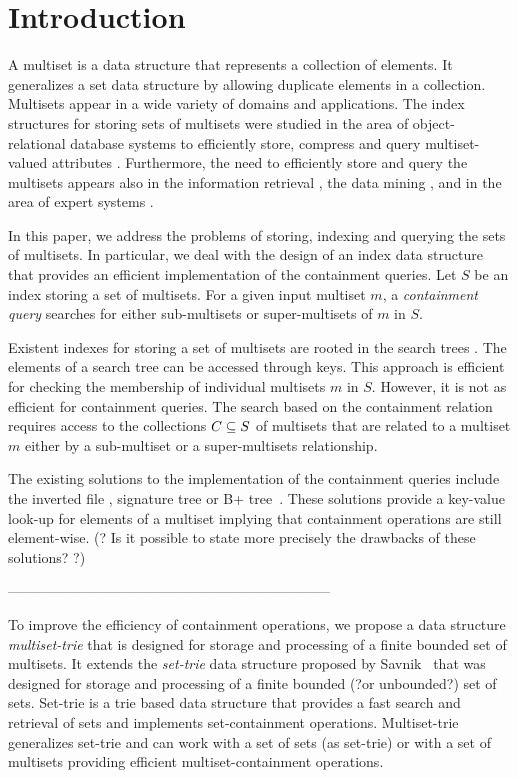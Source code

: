\section{Introduction} \label{c:introduction}
%
%
A multiset is a data structure that represents a collection of elements. It generalizes a set data structure by allowing duplicate elements in a collection. Multisets appear in a wide variety of domains and applications. The index structures for storing sets of multisets were studied in the area of object-relational database systems to efficiently store, compress and query multiset-valued attributes \cite{bouros2016set,gripon2012compressing,ross2004symmetric,steinruecken2015compressing}. Furthermore, the need to efficiently store and query the multisets appears also in the information retrieval \cite{manningBook}, the data mining \cite{interestingSets}, and in the area of expert systems \cite{reteAlgorithm}. 
%

In this paper, we address the problems of storing, indexing and querying the sets of multisets. In particular, we deal with the design of an index data structure that provides an efficient implementation of the containment queries. Let $S$ be an index storing a set of multisets. For a given input multiset $m$, a \emph{containment query} searches for either sub-multisets or super-multisets of $m$ in $S$. 

Existent indexes for storing a set of multisets are rooted in the search trees \cite{rivestBook}. The elements of a search tree can be accessed through keys. This approach is efficient for checking the membership of individual multisets $m$ in $S$. However, it is not as efficient for  containment queries. The search based on the containment relation requires access to the collections $C\subseteq\/S$ of multisets that are related to a multiset $m$ either by a sub-multiset or a super-multisets relationship. 

The existing solutions to the implementation of the containment queries include the inverted file \cite{manningBook}, signature tree \cite{} or B+ tree~\cite{Helmer2003}. These solutions provide a key-value look-up for elements of a multiset implying that containment operations are still element-wise. (? Is it possible to state more precisely the drawbacks of these solutions? ?) 
%

---------------------------------------------------------------------

%
To improve the efficiency of containment operations, we propose a data structure \emph{multiset-trie} that is designed for storage and processing of a finite bounded set of multisets. It extends the \emph{set-trie} data structure proposed by Savnik~\cite{savnik2013index} that was designed for storage and processing of a finite bounded (?or unbounded?) set of sets. 
%
Set-trie is a trie based data structure that provides a fast search and retrieval of sets and implements set-containment operations. 
%
Multiset-trie generalizes set-trie and can work with a set of sets (as set-trie) or with 
a set of multisets providing efficient multiset-containment operations.


